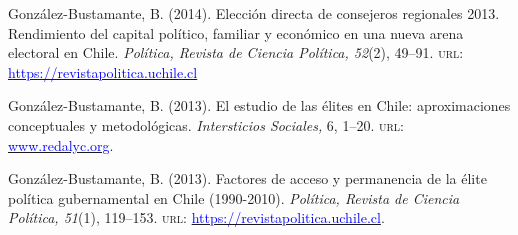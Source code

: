 \begin{publications}
\begin{benumerate}{14}

\item{González-Bustamante, B. (2014). Elección directa de consejeros regionales 2013. Rendimiento del capital político, familiar y económico en una nueva arena electoral en Chile. {\itshape Política, Revista de Ciencia Política, 52}(2), 49--91. {\scshape url:} \href{https://revistapolitica.uchile.cl/index.php/RP/article/view/36137}{\textcolor{blue}{https://revistapolitica.uchile.cl}}} \vspace{1mm}


\item{González-Bustamante, B. (2013). El estudio de las élites en Chile: aproximaciones conceptuales y metodológicas. {\itshape Intersticios Sociales,} 6, 1--20. {\scshape url:} \href{https://www.redalyc.org/articulo.oa?id=421739499004}{\textcolor{blue}{www.redalyc.org}}.} \vspace{1mm}


\item{González-Bustamante, B. (2013). Factores de acceso y permanencia de la élite política gubernamental en Chile (1990-2010). {\itshape Política, Revista de Ciencia Política, 51}(1), 119--153. {\scshape url:} \href{https://revistapolitica.uchile.cl/index.php/RP/article/view/27436}{\textcolor{blue}{https://revistapolitica.uchile.cl}}.} \vspace{1mm} %


\end{benumerate}
\end{publications}
